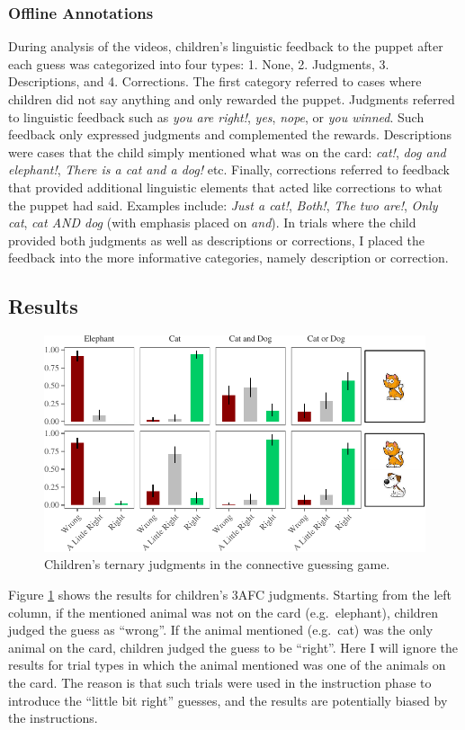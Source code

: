 \documentclass[oneside]{report}
\theoremstyle{definition}
\theoremstyle{definition}
\theoremstyle{definition}
\theoremstyle{remark}
\begin{document}
\subsubsection{Offline Annotations}\label{feedbackCoding}

During analysis of the videos, children's linguistic feedback to the
puppet after each guess was categorized into four types: 1. None, 2.
Judgments, 3. Descriptions, and 4. Corrections. The first category
referred to cases where children did not say anything and only rewarded
the puppet. Judgments referred to linguistic feedback such as \emph{you
are right!}, \emph{yes}, \emph{nope}, or \emph{you winned}. Such
feedback only expressed judgments and complemented the rewards.
Descriptions were cases that the child simply mentioned what was on the
card: \emph{cat!}, \emph{dog and elephant!}, \emph{There is a cat and a
dog!} etc. Finally, corrections referred to feedback that provided
additional linguistic elements that acted like corrections to what the
puppet had said. Examples include: \emph{Just a cat!}, \emph{Both!},
\emph{The two are!}, \emph{Only cat}, \emph{cat AND dog} (with emphasis
placed on \emph{and}). In trials where the child provided both judgments
as well as descriptions or corrections, I placed the feedback into the
more informative categories, namely description or correction.

\subsection{Results}\label{results-3}
\begin{figure}[t]

{\centering \includegraphics{figs/childrenTernaryPlot-1} 

}

\caption{Children's ternary judgments in the connective guessing game.}\label{fig:childrenTernaryPlot}
\end{figure}
Figure \ref{fig:childrenTernaryPlot} shows the results for children's
3AFC judgments. Starting from the left column, if the mentioned animal
was not on the card (e.g.~elephant), children judged the guess as
``wrong''. If the animal mentioned (e.g.~cat) was the only animal on the
card, children judged the guess to be ``right''. Here I will ignore the
results for trial types in which the animal mentioned was one of the
animals on the card. The reason is that such trials were used in the
instruction phase to introduce the ``little bit right'' guesses, and the
results are potentially biased by the instructions.
\end{document}
